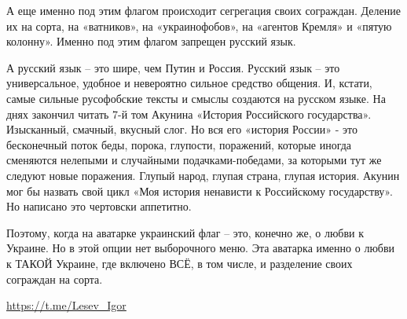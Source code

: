 А еще именно под этим флагом происходит сегрегация своих сограждан. Деление их
на сорта, на «ватников», на «украинофобов», на «агентов Кремля» и «пятую
колонну». Именно под этим флагом запрещен русский язык.

А русский язык – это шире, чем Путин и Россия. Русский язык – это
универсальное, удобное и невероятно сильное средство общения. И, кстати, самые
сильные русофобские тексты и смыслы создаются на русском языке. На днях
закончил читать 7-й том Акунина «История Российского государства». Изысканный,
смачный, вкусный слог. Но вся его «история России» - это бесконечный поток
беды, порока, глупости, поражений, которые иногда сменяются нелепыми и
случайными подачками-победами, за которыми тут же следуют новые поражения.
Глупый народ, глупая страна, глупая история. Акунин мог бы назвать свой цикл
«Моя история ненависти к Российскому государству». Но написано это чертовски
аппетитно.

Поэтому, когда на аватарке украинский флаг – это, конечно же, о любви к
Украине. Но в этой опции нет выборочного меню. Эта аватарка именно о любви к
ТАКОЙ Украине, где включено ВСЁ, в том числе, и разделение своих сограждан на
сорта.

\url{https://t.me/Lesev_Igor}
